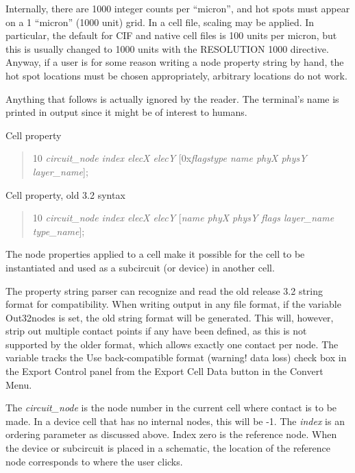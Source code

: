 \begin{description}
Internally, there are 1000 integer counts per ``micron'', and hot
spots must appear on a 1 ``micron'' (1000 unit) grid.  In a cell file,
scaling may be applied.  In particular, the default for CIF and native
cell files is 100 units per micron, but this is usually changed to
1000 units with the {\vt RESOLUTION 1000} directive.  Anyway, if a
user is for some reason writing a node property string by hand, the
hot spot locations must be chosen appropriately, arbitrary locations
do not work.

Anything that follows is actually ignored by the reader.  The
terminal's name is printed in output since it might be of interest to
humans.

Cell property\\
\begin{quote}{ 10} {\it circuit\_node index elecX elecY\/} [{\vt 0x}{\it flagstype
 name phyX physY layer\_name\/}];
\end{quote}

Cell property, old 3.2 syntax\\
\begin{quote}{ 10} {\it circuit\_node index elecX elecY\/} [{\it name phyX physY
 flags layer\_name type\_name\/}];
\end{quote}

The {\et node} properties applied to a cell make it possible for the
cell to be instantiated and used as a subcircuit (or device) in
another cell.

The property string parser can recognize and read the old release 3.2
string format for compatibility.  When writing output in any file
format, if the variable {\et Out32nodes} is set, the old string format
will be generated.  This will, however, strip out multiple contact
points if any have been defined, as this is not supported by the older
format, which allows exactly one contact per node.  The variable
tracks the {\cb Use back-compatible format (warning!  data loss)}
check box in the {\cb Export Control} panel from the {\cb Export
Cell Data} button in the {\cb Convert Menu}.

The {\it circuit\_node} is the node number in the current cell where
contact is to be made.  In a device cell that has no internal nodes,
this will be -1.  The {\it index} is an ordering parameter as
discussed above.  Index zero is the reference node.  When the device
or subcircuit is placed in a schematic, the location of the reference
node corresponds to where the user clicks.


\end{description}
